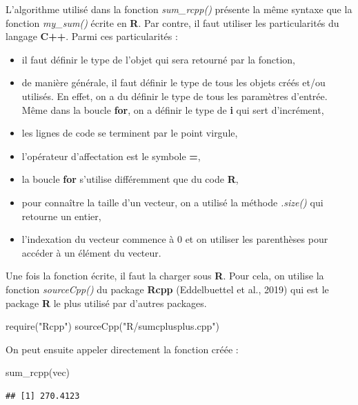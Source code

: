 \documentclass[
]{book}
\newenvironment{Shaded}{\begin{snugshade}}{\end{snugshade}}
\newcommand{\FunctionTok}[1]{\textcolor[rgb]{0.00,0.00,0.00}{#1}}
\newcommand{\NormalTok}[1]{#1}
\newcommand{\StringTok}[1]{\textcolor[rgb]{0.31,0.60,0.02}{#1}}
\theoremstyle{definition}
\theoremstyle{definition}
\theoremstyle{definition}
\theoremstyle{definition}
\theoremstyle{remark}
\begin{document}
L'algorithme utilisé dans la fonction \emph{sum\_rcpp()} présente la même syntaxe que la fonction \emph{my\_sum()} écrite en \textbf{R}. Par contre, il faut utiliser les particularités du langage \textbf{C++}. Parmi ces particularités :

\begin{itemize}
\item
  il faut définir le type de l'objet qui sera retourné par la fonction,
\item
  de manière générale, il faut définir le type de tous les objets créés et/ou utilisés. En effet, on a du définir le type de tous les paramètres d'entrée. Même dans la boucle \textbf{for}, on a définir le type de \textbf{i} qui sert d'incrément,
\item
  les lignes de code se terminent par le point virgule,
\item
  l'opérateur d'affectation est le symbole \textbf{=},
\item
  la boucle \textbf{for} s'utilise différemment que du code \textbf{R},
\item
  pour connaître la taille d'un vecteur, on a utilisé la méthode \emph{.size()} qui retourne un entier,
\item
  l'indexation du vecteur commence à 0 et on utiliser les parenthèses pour accéder à un élément du vecteur.
\end{itemize}

Une fois la fonction écrite, il faut la charger sous \textbf{R}. Pour cela, on utilise la fonction \emph{sourceCpp()} du package \textbf{Rcpp} (Eddelbuettel et al., 2019) qui est le package \textbf{R} le plus utilisé par d'autres packages.

\begin{Shaded}
\begin{Highlighting}[]
\FunctionTok{require}\NormalTok{(}\StringTok{"Rcpp"}\NormalTok{)}
\FunctionTok{sourceCpp}\NormalTok{(}\StringTok{"R/sumcplusplus.cpp"}\NormalTok{)}
\end{Highlighting}
\end{Shaded}

On peut ensuite appeler directement la fonction créée :

\begin{Shaded}
\begin{Highlighting}[]
\FunctionTok{sum\_rcpp}\NormalTok{(vec)}
\end{Highlighting}
\end{Shaded}

\begin{verbatim}
## [1] 270.4123
\end{verbatim}
\end{document}
